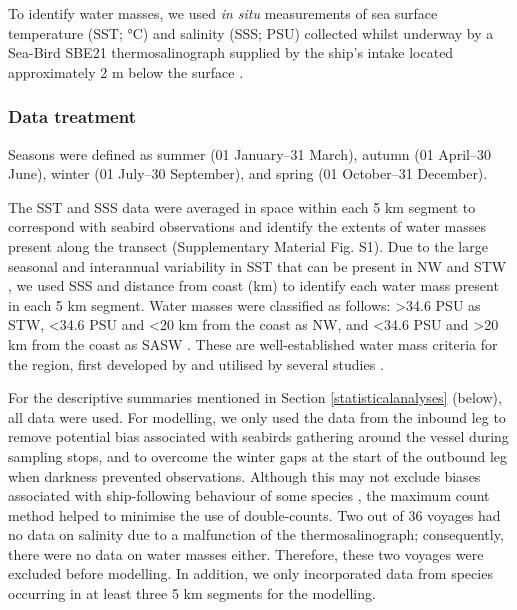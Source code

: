 \documentclass[preprint, 3p, authoryear]{elsarticle} %
\begin{document}
To identify water masses, we used \emph{in situ} measurements of sea surface temperature (SST; °C) and salinity (SSS; PSU) collected whilst underway by a Sea-Bird SBE21 thermosalinograph supplied by the ship's intake located approximately 2 m below the surface \citep{jones2013}.

\hypertarget{data-treatment}{%
\subsubsection{Data treatment}\label{data-treatment}}

Seasons were defined as summer (01 January--31 March), autumn (01 April--30 June), winter (01 July--30 September), and spring (01 October--31 December).

The SST and SSS data were averaged in space within each 5 km segment to correspond with seabird observations and identify the extents of water masses present along the transect (Supplementary Material Fig. S1). Due to the large seasonal and interannual variability in SST that can be present in NW and STW \citep{shaw2001, jones2013, stevens2021}, we used SSS and distance from coast (km) to identify each water mass present in each 5 km segment. Water masses were classified as follows: \textgreater34.6 PSU as STW, \textless34.6 PSU and \textless20 km from the coast as NW, and \textless34.6 PSU and \textgreater20 km from the coast as SASW \citep{jillett1969, stevens2021, johnson2024}. These are well-established water mass criteria for the region, first developed by \citet{jillett1969} and utilised by several studies \citep{currie1999, shaw2001, hopkins2010, jones2013, johnson2024}.

For the descriptive summaries mentioned in Section \ref{statisticalanalyses} (below), all data were used. For modelling, we only used the data from the inbound leg to remove potential bias associated with seabirds gathering around the vessel during sampling stops, and to overcome the winter gaps at the start of the outbound leg when darkness prevented observations. Although this may not exclude biases associated with ship-following behaviour of some species \citep[e.g.][]{griffiths1982, hyrenbach2001}, the maximum count method helped to minimise the use of double-counts. Two out of 36 voyages had no data on salinity due to a malfunction of the thermosalinograph; consequently, there were no data on water masses either. Therefore, these two voyages were excluded before modelling. In addition, we only incorporated data from species occurring in at least three 5 km segments for the modelling.
\end{document}
